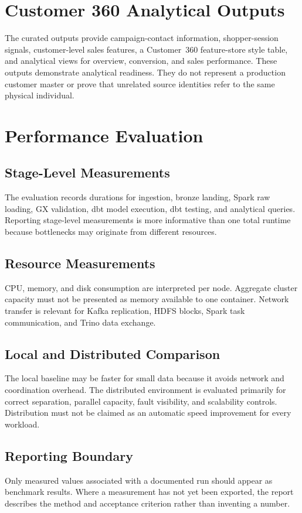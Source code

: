 \section{Customer 360 Analytical Outputs}
The curated outputs provide campaign-contact information, shopper-session signals, customer-level sales features, a Customer~360 feature-store style table, and analytical views for overview, conversion, and sales performance. These outputs demonstrate analytical readiness. They do not represent a production customer master or prove that unrelated source identities refer to the same physical individual.

\section{Performance Evaluation}

\subsection{Stage-Level Measurements}
The evaluation records durations for ingestion, bronze landing, Spark raw loading, GX validation, dbt model execution, dbt testing, and analytical queries. Reporting stage-level measurements is more informative than one total runtime because bottlenecks may originate from different resources.

\subsection{Resource Measurements}
CPU, memory, and disk consumption are interpreted per node. Aggregate cluster capacity must not be presented as memory available to one container. Network transfer is relevant for Kafka replication, HDFS blocks, Spark task communication, and Trino data exchange.

\subsection{Local and Distributed Comparison}
The local baseline may be faster for small data because it avoids network and coordination overhead. The distributed environment is evaluated primarily for correct separation, parallel capacity, fault visibility, and scalability controls. Distribution must not be claimed as an automatic speed improvement for every workload.

\subsection{Reporting Boundary}
Only measured values associated with a documented run should appear as benchmark results. Where a measurement has not yet been exported, the report describes the method and acceptance criterion rather than inventing a number.

